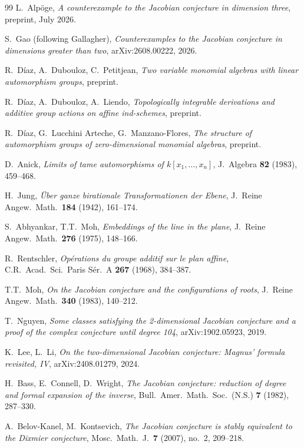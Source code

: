 \documentclass[12pt,a4paper]{article}
\theoremstyle{definition}
\begin{document}
\begin{thebibliography}{99}
L.~Alp\"oge, \emph{A counterexample to the Jacobian conjecture in dimension three},
preprint, July 2026.

S.~Gao (following Gallagher), \emph{Counterexamples to the Jacobian conjecture in
dimensions greater than two}, arXiv:2608.00222, 2026.

R.~D\'iaz, A.~Dubouloz, C.~Petitjean, \emph{Two variable monomial algebras with linear
automorphism groups}, preprint.

R.~D\'iaz, A.~Dubouloz, A.~Liendo, \emph{Topologically integrable derivations and additive
group actions on affine ind-schemes}, preprint.

R.~D\'iaz, G.~Lucchini Arteche, G.~Manzano-Flores, \emph{The structure of automorphism
groups of zero-dimensional monomial algebras}, preprint.

D.~Anick, \emph{Limits of tame automorphisms of $k[x_1,\ldots,x_n]$}, J.~Algebra
\textbf{82} (1983), 459--468.

H.~Jung, \emph{\"Uber ganze birationale Transformationen der Ebene}, J.~Reine Angew.\ Math.\
\textbf{184} (1942), 161--174.

S.~Abhyankar, T.T.~Moh, \emph{Embeddings of the line in the plane}, J.~Reine Angew.\ Math.\
\textbf{276} (1975), 148--166.

R.~Rentschler, \emph{Op\'erations du groupe additif sur le plan affine}, C.R.\ Acad.\ Sci.\
Paris S\'er.\ A \textbf{267} (1968), 384--387.

\bibitem{Moh}
T.T.~Moh, \emph{On the Jacobian conjecture and the configurations of roots}, J.~Reine
Angew.\ Math.\ \textbf{340} (1983), 140--212.

\bibitem{Nguyen}
T.~Nguyen, \emph{Some classes satisfying the 2-dimensional Jacobian conjecture and a proof
of the complex conjecture until degree 104}, arXiv:1902.05923, 2019.

\bibitem{LeeLi}
K.~Lee, L.~Li, \emph{On the two-dimensional Jacobian conjecture: Magnus' formula
revisited, IV}, arXiv:2408.01279, 2024.

\bibitem{BCW}
H.~Bass, E.~Connell, D.~Wright, \emph{The Jacobian conjecture: reduction of degree and
formal expansion of the inverse}, Bull.\ Amer.\ Math.\ Soc.\ (N.S.) \textbf{7} (1982),
287--330.

\bibitem{BKK}
A.~Belov-Kanel, M.~Kontsevich, \emph{The Jacobian conjecture is stably equivalent to the
Dixmier conjecture}, Mosc.\ Math.\ J.\ \textbf{7} (2007), no.~2, 209--218.


\end{thebibliography}
\end{document}
